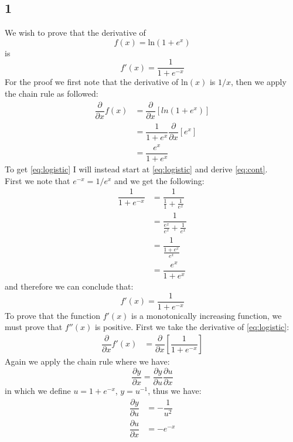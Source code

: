 \documentclass{article}
\begin{document}
\subsection{1}
We wish to prove that the derivative of
\begin{equation}
f(x) = \text{ln}(1+e^x)
\end{equation}
is
\begin{equation}
\label{eq:logistic}
f'(x) = \dfrac{1}{1+e^{-x}}
\end{equation}
For the proof we first note that the derivative of $\text{ln}(x)$ is $1/x$, then we apply the chain rule as followed:
\begin{align}
\dfrac{\partial}{\partial x} f(x) &= \dfrac{\partial}{\partial x} \left[ln(1+e^x)\right] \\
&= \dfrac{1}{1 + e^x} \dfrac{\partial}{\partial x} \left[e^x\right] \\
\label{eq:cont}
&= \dfrac{e^x}{1+e^x}
\end{align}
To get \eqref{eq:logistic} I will instead start at \eqref{eq:logistic} and derive \eqref{eq:cont}.\\
First we note that $e^{-x} = 1/e^x$ and we get the following:
\begin{align*}
\dfrac{1}{1+e^{-x}} &= \dfrac{1}{ \frac{1}{1} + \frac{1}{e^x}} \\
&= \dfrac{1}{ \frac{e^x}{e^x} + \frac{1}{e^x}} \\
&= \dfrac{1}{ \frac{1+ e^x}{e^x} } \\
&= \dfrac{e^x}{1+e^x}
\end{align*}
and therefore we can conclude that:
\begin{equation*}
f'(x) = \dfrac{1}{1+e^{-x}}
\end{equation*}
To prove that the function $f'(x)$ is a monotonically increasing function, we must prove that $f''(x)$ is positive. First we take the derivative of \eqref{eq:logistic}:
\begin{align*}
\dfrac{\partial}{\partial x} f'(x) &= \dfrac{\partial}{\partial x} \left[ \dfrac{1}{1+e^{-x}} \right]
\end{align*}
Again we apply the chain rule where we have:
\begin{equation*}
\dfrac{\partial y}{\partial x} = \dfrac{\partial y}{\partial u} \dfrac{\partial u}{\partial x}
\end{equation*}
in which we define $u = 1+e^{-x}$, $y = u^{-1}$, thus we have:
\begin{align*}
\dfrac{\partial y}{\partial u} &= - \dfrac{1}{u^2} \\
\dfrac{\partial u}{\partial x} &= -e^{-x}
\end{align*}
\end{document}
